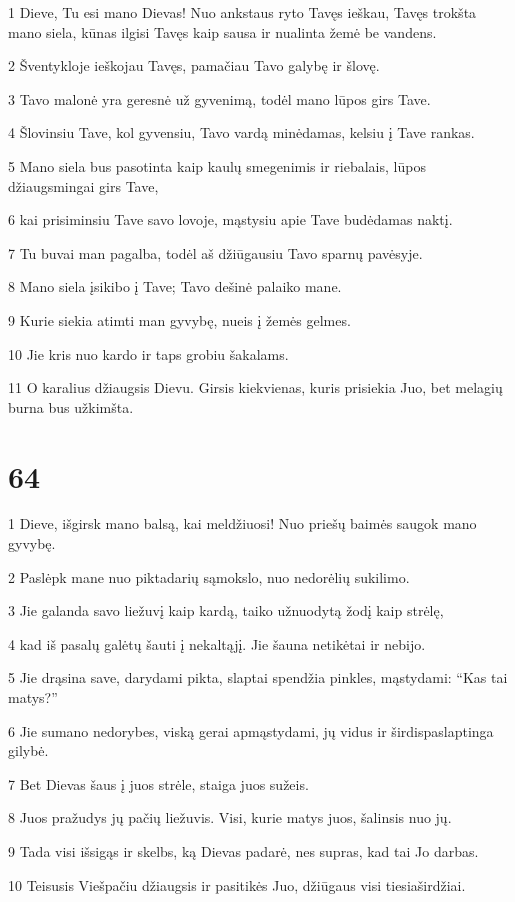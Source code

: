 \par 1 Dieve, Tu esi mano Dievas! Nuo ankstaus ryto Tavęs ieškau, Tavęs trokšta mano siela, kūnas ilgisi Tavęs kaip sausa ir nualinta žemė be vandens. 
\par 2 Šventykloje ieškojau Tavęs, pamačiau Tavo galybę ir šlovę. 
\par 3 Tavo malonė yra geresnė už gyvenimą, todėl mano lūpos girs Tave. 
\par 4 Šlovinsiu Tave, kol gyvensiu, Tavo vardą minėdamas, kelsiu į Tave rankas. 
\par 5 Mano siela bus pasotinta kaip kaulų smegenimis ir riebalais, lūpos džiaugsmingai girs Tave, 
\par 6 kai prisiminsiu Tave savo lovoje, mąstysiu apie Tave budėdamas naktį. 
\par 7 Tu buvai man pagalba, todėl aš džiūgausiu Tavo sparnų pavėsyje. 
\par 8 Mano siela įsikibo į Tave; Tavo dešinė palaiko mane. 
\par 9 Kurie siekia atimti man gyvybę, nueis į žemės gelmes. 
\par 10 Jie kris nuo kardo ir taps grobiu šakalams. 
\par 11 O karalius džiaugsis Dievu. Girsis kiekvienas, kuris prisiekia Juo, bet melagių burna bus užkimšta.



\chapter{64}


\par 1 Dieve, išgirsk mano balsą, kai meldžiuosi! Nuo priešų baimės saugok mano gyvybę. 
\par 2 Paslėpk mane nuo piktadarių sąmokslo, nuo nedorėlių sukilimo. 
\par 3 Jie galanda savo liežuvį kaip kardą, taiko užnuodytą žodį kaip strėlę, 
\par 4 kad iš pasalų galėtų šauti į nekaltąjį. Jie šauna netikėtai ir nebijo. 
\par 5 Jie drąsina save, darydami pikta, slaptai spendžia pinkles, mąstydami: “Kas tai matys?” 
\par 6 Jie sumano nedorybes, viską gerai apmąstydami, jų vidus ir širdis­paslaptinga gilybė. 
\par 7 Bet Dievas šaus į juos strėle, staiga juos sužeis. 
\par 8 Juos pražudys jų pačių liežuvis. Visi, kurie matys juos, šalinsis nuo jų. 
\par 9 Tada visi išsigąs ir skelbs, ką Dievas padarė, nes supras, kad tai Jo darbas. 
\par 10 Teisusis Viešpačiu džiaugsis ir pasitikės Juo, džiūgaus visi tiesiaširdžiai.



